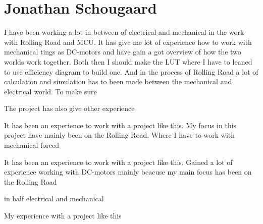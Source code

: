 \section{Jonathan Schougaard}

I have been working a lot in between of electrical and mechanical in the work with Rolling Road and MCU. It has give me lot of experience how to work with mechanical tings as DC-motors and have gain a got overview of how the two worlds work together. Both then I should make the LUT where I have to leaned to use efficiency diagram to build one. And in the process of Rolling Road a lot of calculation and simulation has to been made between the mechanical and electrical world. To make sure 


The project has also give other experience 

It has been an experience to work with a project like this. My focus in this project have mainly been on the Rolling Road. Where I have to work with mechanical forced  

It has been an experience to work with a project like this. Gained a lot of experience working with DC-motors mainly beacuse my main focus has been on the Rolling Road

 in half electrical and mechanical   

My experience with a project like this 